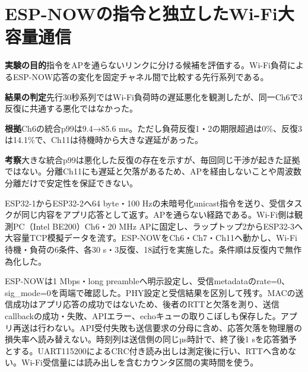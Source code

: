 \documentclass[a4paper,10pt]{ltjsarticle}
\begin{document}
\section{ESP-NOWの指令と独立したWi-Fi大容量通信}
\par\smallskip\noindent\textbf{実験の目的}\quad 指令をAPを通らないリンクに分ける候補を評価する。Wi-Fi負荷によるESP-NOW応答の変化を固定チャネル間で比較する先行系列である。

\par\smallskip\noindent\textbf{結果の判定}\quad 先行30秒系列ではWi-Fi負荷時の遅延悪化を観測したが、同一Ch6で3反復に共通する悪化ではなかった。

\noindent\textbf{根拠}\quad Ch6の統合p99は9.4→85.6 ms。ただし負荷反復1・2の期限超過は0\%、反復3は14.1\%で、Ch11は待機時から大きな遅延があった。

\noindent\textbf{考察}\quad 大きな統合p99は悪化した反復の存在を示すが、毎回同じ干渉が起きた証拠ではない。分離Ch11にも遅延と欠落があるため、APを経由しないことや周波数分離だけで安定性を保証できない。

ESP32-1からESP32-2へ64 byte・100 Hzの未暗号化unicast指令を送り、受信タスクが同じ内容をアプリ応答として返す。APを通らない経路である。Wi-Fi側は観測PC（Intel BE200）Ch6・20 MHz APに固定し、ラップトップ2からESP32-3へ大容量TCP模擬データを流す。ESP-NOWをCh6・Ch7・Ch11へ動かし、Wi-Fi待機・負荷の6条件、各30 s・3反復、18試行を実施した。条件順は反復内で無作為化した。

ESP-NOWは1 Mbps・long preambleへ明示設定し、受信metadataのrate=0、sig\_mode=0を両端で確認した。PHY設定と受信結果を区別して残す。MACの送信成功はアプリ応答の成功ではない\cite{espnowGuide}ため、後者のRTTと欠落を測り、送信callbackの成功・失敗、APIエラー、echoキューの取りこぼしも保存した。アプリ再送は行わない。API受付失敗も送信要求の分母に含め、応答欠落を物理層の損失率へ読み替えない。時刻列は送信側の同じµs時計で、終了後1 sを応答猶予とする。UART115200によるCRC付き読み出しは測定後に行い、RTTへ含めない。Wi-Fi受信量には読み出しを含むカウンタ区間の実時間を使う。
\end{document}
